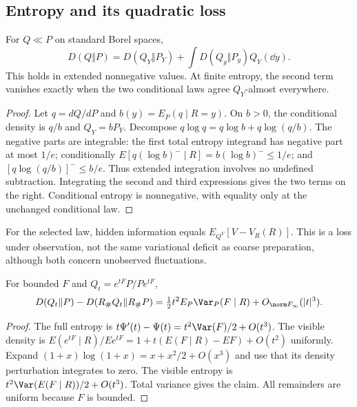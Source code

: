 \subsection{Entropy and its quadratic loss}
\begin{theorem}\label{thm:entropy-chain}
For $Q\ll P$ on standard Borel spaces,
\begin{equation}
 D(Q\Vert P)=D(Q_Y\Vert P_Y)
 +\int D(Q_y\Vert P_y)Q_Y(\dd y).
 \label{eq:entropy-chain}
\end{equation}
This holds in extended nonnegative values. At finite entropy, the second term vanishes exactly when the two conditional laws agree $Q_Y$-almost everywhere.
\end{theorem}
\begin{proof}
Let $q=dQ/dP$ and $b(y)=E_P(q\mid R=y)$. On $b>0$, the conditional density is $q/b$ and $Q_Y=bP_Y$. Decompose $q\log q=q\log b+q\log(q/b)$. The negative parts are integrable: the first total entropy integrand has negative part at most $1/e$; conditionally $E[q(\log b)^-\mid R]=b(\log b)^-\le1/e$; and $[q\log(q/b)]^-\le b/e$. Thus extended integration involves no undefined subtraction. Integrating the second and third expressions gives the two terms on the right. Conditional entropy is nonnegative, with equality only at the unchanged conditional law.
\end{proof}

For the selected law, hidden information equals $E_{Q^V}[V-V_R(R)]$. This is a loss under observation, not the same variational deficit as coarse preparation, although both concern unobserved fluctuations.

\begin{proposition}\label{prop:hidden-tangent}
For bounded $F$ and $Q_t=e^{tF}P/Pe^{tF}$,
\[
 D(Q_t\Vert P)-D(R_\#Q_t\Vert R_\#P)
 =\tfrac12t^2E_P\Var_P(F\mid R)+O_{\norm F_\infty}(|t|^3).
\]
\end{proposition}
\begin{proof}
The full entropy is $t\Psi'(t)-\Psi(t)=t^2\Var(F)/2+O(t^3)$. The visible density is
$E(e^{tF}\mid R)/Ee^{tF}=1+t(E(F\mid R)-EF)+O(t^2)$ uniformly. Expand $(1+x)\log(1+x)=x+x^2/2+O(x^3)$ and use that its density perturbation integrates to zero. The visible entropy is $t^2\Var(E(F\mid R))/2+O(t^3)$. Total variance gives the claim. All remainders are uniform because $F$ is bounded.
\end{proof}


